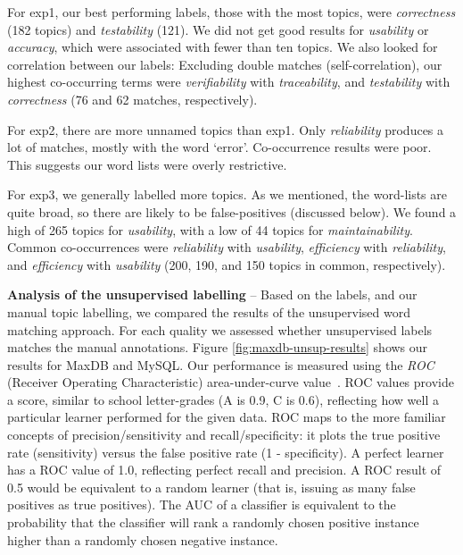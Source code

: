 \documentclass[]{sig-alternate}
\begin{document}
For \textsf{exp1}, our best performing labels, those with the most topics, were \emph{correctness} (182 topics) and \emph{testability} (121). 
We did not get good results for \emph{usability} or \emph{accuracy}, which were associated with fewer than ten topics. 
We also looked for correlation between our labels: Excluding double matches (self-correlation), our highest co-occurring terms were \emph{verifiability} with \emph{traceability}, and \emph{testability} with \emph{correctness} (76 and 62 matches, respectively).

For \textsf{exp2}, there are more unnamed topics than \textsf{exp1}. 
Only \emph{reliability} produces a lot of matches, mostly with the word `error'. 
Co-occurrence results were poor. This suggests our word lists were overly restrictive.

For \textsf{exp3}, we generally labelled more topics. 
As we mentioned, the word-lists are quite broad, so there are likely to be false-positives (discussed below). 
We found a high of 265 topics for \emph{usability}, with a low of 44 topics for \emph{maintainability}. 
Common co-occurrences were \emph{reliability} with \emph{usability}, \emph{efficiency} with \emph{reliability}, and \emph{efficiency} with \emph{usability} (200, 190, and 150 topics in common, respectively). 


\textbf{Analysis of the unsupervised labelling} -- Based on the labels, and our manual topic labelling, 
we compared the results of the unsupervised word matching approach. 
For each quality we assessed whether unsupervised labels matches the manual annotations.
Figure \ref{fig:maxdb-unsup-results} shows our results for MaxDB and MySQL. 
Our performance is measured using the \emph{ROC} (Receiver Operating Characteristic) area-under-curve value~\cite{Fawcett2006861}. 
ROC values provide a score, similar to school letter-grades (A is 0.9, C is 0.6), reflecting how well a particular learner performed for the given data. 
ROC maps to the more familiar concepts of precision/sensitivity and recall/specificity: it plots the true positive rate (sensitivity) versus the false positive rate (1 - specificity). 
A perfect learner has a ROC value of 1.0, reflecting perfect recall and precision. 
A ROC result of 0.5 would be equivalent to a random learner (that is, issuing as many false positives as true positives). 
The AUC of a classifier is equivalent to the probability that the classifier will rank a randomly chosen positive instance higher than a randomly chosen negative instance.
\end{document}
